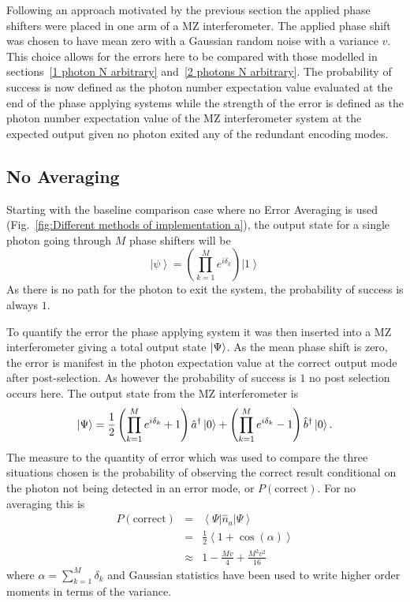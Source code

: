 \documentclass[aps,pra,twocolumn,superscriptaddress,numerical,floatfix]{revtex4-1}
\begin{document}
Following an approach motivated by the previous section the applied phase shifters were placed in one arm of a MZ interferometer. The applied phase shift was chosen to have mean zero with a Gaussian random noise with a variance $v$. This choice allows for the errors here to be compared with those modelled in sections~\ref{1 photon N arbitrary} and~\ref{2 photons N arbitrary}. The probability of success is now defined as the photon number expectation value evaluated at the end of the phase applying systems while the strength of the error is defined as the photon number expectation value of the MZ interferometer system at the expected output given no photon exited any of the redundant encoding modes. 


\subsection{No Averaging\label{No Averaging}}

Starting with the baseline comparison case where no Error Averaging is used (Fig.~\ref{fig:Different methods of implementation a}), the output state for a single photon going through $M$ phase shifters will be
\begin{equation}
\left|\psi\right\rangle =\left(\prod_{k=1}^{M}e^{i\delta_{k}}\right)\left|1\right\rangle \label{eq:noAvPhaseState}
\end{equation}
As there is no path for the photon to exit the system, the probability of success is always $1$.

To quantify the error the phase applying system it was then inserted into a MZ interferometer giving a total output state $\ket{\Psi}$.  As the mean phase shift is zero, the error is manifest in the photon expectation value at the correct output mode after post-selection. As however the probability of success is $1$ no post selection occurs here.  The output state from the MZ interferometer is
\begin{equation}
	\ket{\Psi} =\frac{1}{2}\left(\prod_{k=1}^{M}e^{i\delta_{k}}+1\right)\hat{a}^{\dagger}\ket{0}+\left(\prod_{k=1}^{M}e^{i\delta_{k}}-1\right)\hat{b}^{\dagger}\ket{0}. \label{eq:noAveIntState}
\end{equation}
The measure to the quantity of error which was used to compare the three situations chosen is the probability of observing the correct result conditional on the photon not being detected in an error mode, or $P(\textrm{correct})$. For no averaging this is
\begin{eqnarray}
P(\textrm{correct}) & = & \left\langle \Psi\right|\hat{n}_{a}\left|\Psi\right\rangle \nonumber \\
& = & \frac{1}{2}\left\langle 1+\cos\left(\alpha\right)\right\rangle \nonumber \\
& \approx & 1-\frac{Mv}{4}+\frac{M^{2}v^{2}}{16}\label{eq:ErrorNoAv1}
\end{eqnarray}
where $\alpha=\sum_{k=1}^{M}\delta_{k}$ and Gaussian statistics have been used to write higher order moments in terms of the variance.
\end{document}
